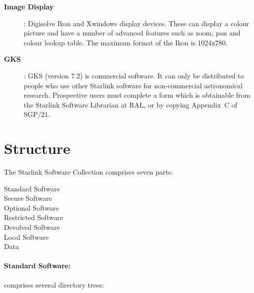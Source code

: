\begin{description}
\item [\bf Image Display]: Digisolve Ikon and Xwindows display devices. These
can display a colour picture and have a number of advanced features such as
zoom, pan and colour lookup table. The maximum format of the Ikon is 1024x780.

\item [\bf GKS]: GKS (version 7.2) is commercial software. It can only be
distributed to people who use other Starlink software for non-commercial
astronomical research. Prospective users must complete a form which is
obtainable from the Starlink Software Librarian at RAL, or by copying
Appendix~C of SGP/21.

\end{description}

\section {Structure}
\label{se:struct}

The Starlink Software Collection comprises seven parts:
\begin{description}
\begin{description}
\item [Standard Software]
\item [Secure Software]
\item [Optional Software]
\item [Restricted Software]
\item [Devolved Software]
\item [Local Software]
\item [Data]
\end{description}
\end{description}

\paragraph{Standard Software:} comprises several directory trees:

